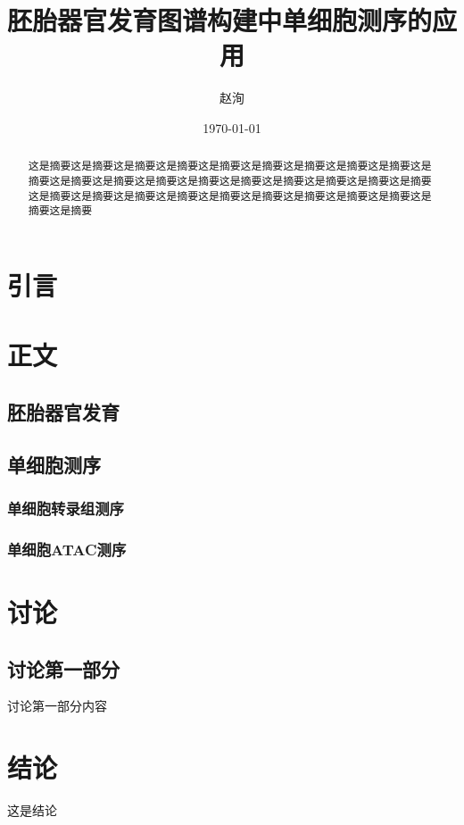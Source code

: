 \documentclass[lang=cn]{elegantpaper}
\title{胚胎器官发育图谱构建中单细胞测序的应用}
\author{赵洵}
\institute{中国科学院大学}
\date{\today}
\begin{document}
    \maketitle

    \renewcommand{\abstractname}{摘要}
    \begin{abstract}
        这是摘要这是摘要这是摘要这是摘要这是摘要这是摘要这是摘要这是摘要这是摘要这是摘要这是摘要这是摘要这是摘要这是摘要这是摘要这是摘要这是摘要这是摘要这是摘要这是摘要这是摘要这是摘要这是摘要这是摘要这是摘要这是摘要这是摘要这是摘要这是摘要这是摘要
    \end{abstract}

	\section{引言}

    \section{正文}
		\subsection{胚胎器官发育}
        \subsection{单细胞测序}
            \subsubsection{单细胞转录组测序}
            \subsubsection{单细胞ATAC测序}
	\section{讨论}
        \subsection{讨论第一部分}
            讨论第一部分内容
	\section{结论}
        这是结论
\end{document}
